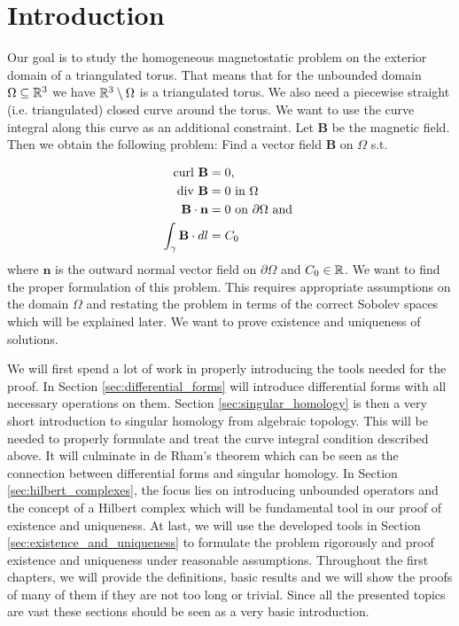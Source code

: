 \documentclass[../master_thesis.tex]{subfiles}
\begin{document}
\section{Introduction}
Our goal is to study the homogeneous magnetostatic problem on the exterior 
domain of a triangulated torus. That means 
that for the unbounded domain  $\Omega \subseteq \mathbb{R}^3$ we have
$\mathbb{R}^3 \setminus \Omega$ is a triangulated torus. We also need a 
piecewise straight (i.e. triangulated) closed curve around the torus.
We want to use the curve integral along this curve as an additional 
constraint.
Let $\mathbf{B}$ be the magnetic field. Then we obtain the following problem:
Find a vector field $\mathbf{B}$ on $\Omega$ s.t.

\begin{align}
    \operatorname{curl} \, \mathbf{B} &= 0, \\ 
    \operatorname{div} \, \mathbf{B}  &= 0 \text{ in } \Omega \\
    \mathbf{B} \cdot \mathbf{n} &= 0 \text{ on } \partial \Omega \text{ and }\\
    \int_\gamma \mathbf{B} \cdot dl &= C_0
\end{align}
where $\mathbf{n}$ is the outward normal vector field on $\partial \Omega$ and 
$C_0 \in \mathbb{R}$. 
We want to find the proper formulation of this problem. This requires 
appropriate assumptions on the domain $\Omega$ and restating the problem
in terms of the correct Sobolev spaces which will be explained later.
We want to prove existence and uniqueness of 
solutions. 

We will first spend a lot of work in properly introducing the tools needed for the proof.
In Section \ref{sec:differential_forms} will introduce differential forms with 
all necessary operations on them. Section \ref{sec:singular_homology} is then a very short
introduction to  
singular homology from algebraic topology. This will be needed to properly formulate and treat the
curve integral condition described above. It will culminate in de Rham's theorem 
which can be seen as the connection between differential forms and singular homology.
In Section \ref{sec:hilbert_complexes}, the focus lies on introducing 
unbounded operators and the concept of a Hilbert complex which will be 
fundamental tool in our proof of existence and uniqueness. At last, we will 
use the developed tools in Section \ref{sec:existence_and_uniqueness} 
to formulate the problem rigorously and proof existence and uniqueness under 
reasonable assumptions. Throughout the first chapters, we will provide the 
definitions, basic results and we will show the proofs of many of them if they are not too 
long or trivial. Since all the presented topics are vast these sections should be 
seen as a very basic introduction.
\end{document}
